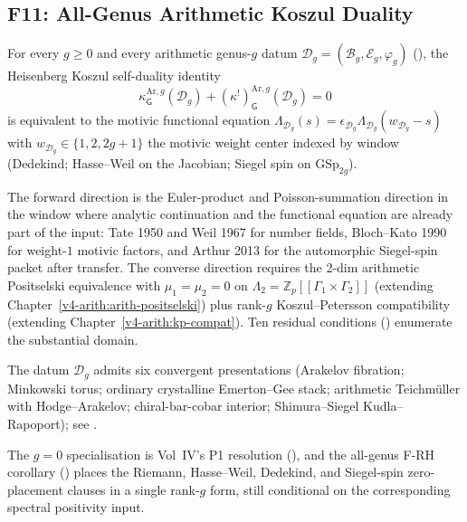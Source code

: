 \subsection{F11: All-Genus Arithmetic Koszul Duality}
\label{v4-arith:of:F11-all-genus}

\begin{conjecture}
\label{v4-arith:conj:F11-all-genus}
For every \(g\geq 0\) and every arithmetic genus-\(g\) datum
\(\mathcal{D}_g=(\mathcal{B}_g,\mathcal{E}_g,\varphi_g)\)
(), the Heisenberg Koszul self-duality
identity
\[
\kappa^{\mathrm{Ar},g}_{\mathsf{G}}(\mathcal{D}_g)+(\kappa^{!})^{\mathrm{Ar},g}_{\mathsf{G}}(\mathcal{D}_g)=0
\]
is equivalent to the motivic functional equation
\(\Lambda_{\mathcal{D}_g}(s)=\epsilon_{\mathcal{D}_g}\Lambda_{\mathcal{D}_g}(w_{\mathcal{D}_g}-s)\)
with \(w_{\mathcal{D}_g}\in\{1,2,2g+1\}\) the motivic weight center
indexed by window (Dedekind; Hasse--Weil on the Jacobian; Siegel spin
on \(\mathrm{GSp}_{2g}\)).
\end{conjecture}

\begin{remark}[form]
The forward direction is the Euler-product and Poisson-summation
direction in the window where analytic continuation and the functional
equation are already part of the input: Tate 1950 and Weil 1967 for
number fields, Bloch--Kato 1990 for weight-\(1\) motivic factors, and
Arthur 2013 for the automorphic Siegel-spin packet after transfer.
The converse direction requires the 2-dim arithmetic Positselski equivalence with
\(\mu_1=\mu_2=0\) on \(\Lambda_2=\mathbb{Z}_p[[\Gamma_1\times\Gamma_2]]\)
(extending Chapter~\ref{v4-arith:arith-positselski}) plus rank-\(g\)
Koszul--Petersson compatibility (extending Chapter~\ref{v4-arith:kp-compat}).
Ten residual conditions () enumerate the
substantial domain.

The datum \(\mathcal{D}_g\) admits
six convergent presentations (Arakelov fibration; Minkowski torus;
ordinary crystalline Emerton--Gee stack; arithmetic Teichmüller with
Hodge--Arakelov; chiral-bar-cobar interior; Shimura--Siegel
Kudla--Rapoport); see .

The \(g=0\) specialisation is
Vol~IV's P1 resolution (), and the
all-genus F-RH corollary ()
places the Riemann, Hasse--Weil, Dedekind, and Siegel-spin
zero-placement clauses in a single rank-\(g\) form, still conditional
on the corresponding spectral positivity input.
\end{remark}

